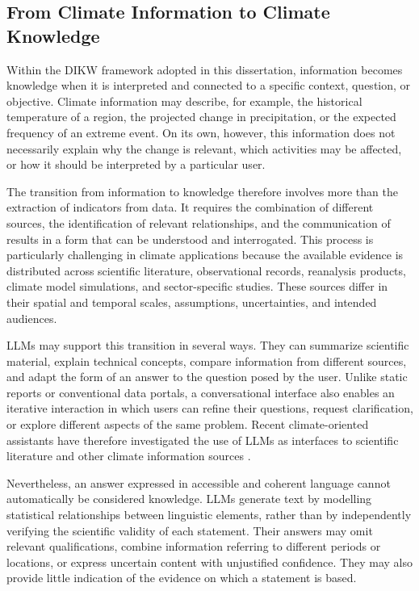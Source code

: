 \subsection{From Climate Information to Climate Knowledge}

Within the DIKW framework adopted in this dissertation, information becomes knowledge when it is interpreted and connected to a specific context, question, or objective. Climate information may describe, for example, the historical temperature of a region, the projected change in precipitation, or the expected frequency of an extreme event. On its own, however, this information does not necessarily explain why the change is relevant, which activities may be affected, or how it should be interpreted by a particular user.

The transition from information to knowledge therefore involves more than the extraction of indicators from data. It requires the combination of different sources, the identification of relevant relationships, and the communication of results in a form that can be understood and interrogated. This process is particularly challenging in climate applications because the available evidence is distributed across scientific literature, observational records, reanalysis products, climate model simulations, and sector-specific studies. These sources differ in their spatial and temporal scales, assumptions, uncertainties, and intended audiences.

LLMs may support this transition in several ways. They can summarize scientific material, explain technical concepts, compare information from different sources, and adapt the form of an answer to the question posed by the user. Unlike static reports or conventional data portals, a conversational interface also enables an iterative interaction in which users can refine their questions, request clarification, or explore different aspects of the same problem. Recent climate-oriented assistants have therefore investigated the use of LLMs as interfaces to scientific literature and other climate information sources \citep{vaghefi_chatclimate_2023,koldunov_local_2024}.

Nevertheless, an answer expressed in accessible and coherent language cannot automatically be considered knowledge. LLMs generate text by modelling statistical relationships between linguistic elements, rather than by independently verifying the scientific validity of each statement. Their answers may omit relevant qualifications, combine information referring to different periods or locations, or express uncertain content with unjustified confidence. They may also provide little indication of the evidence on which a statement is based.


